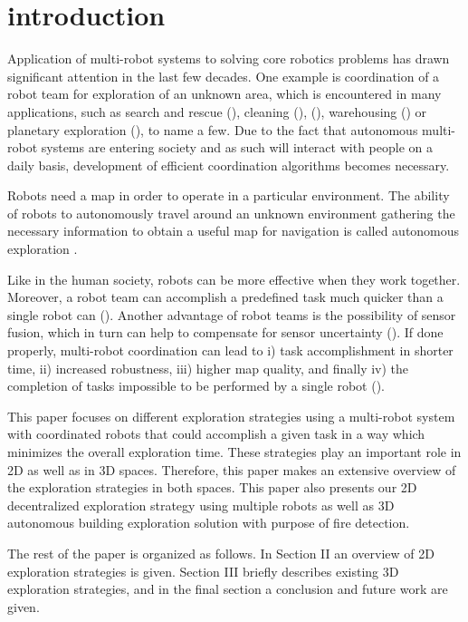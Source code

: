 \section{introduction}

Application of multi-robot systems to solving core robotics problems has drawn significant attention in the last few decades. One example is coordination of a robot team for exploration of an unknown area, which is encountered in many applications, such as search and rescue (\cite{Murphy2004}), cleaning (\cite{Endres}), (\cite{Pinheiro2015}), warehousing (\cite{Wurman2008}) or planetary exploration (\cite{Mataric2001}), to name a few. Due to the fact that autonomous multi-robot systems are entering society and as such will interact with people on a daily basis, development of efficient coordination algorithms becomes necessary.

Robots need a map in order to operate in a particular environment. The ability of robots to autonomously travel around an unknown environment gathering the necessary information to obtain a useful map for navigation is called autonomous exploration \cite{Julia2012}. 

Like in the human society, robots can be more effective when they work together. Moreover, a robot team can accomplish a predefined task much quicker than a single robot can (\cite{Dias2000}). Another advantage of robot teams is the possibility of sensor fusion, which in turn can help to compensate for sensor uncertainty (\cite{Wurm2008}).
If done properly, multi-robot coordination can lead to i) task accomplishment in shorter time, ii) increased robustness, iii) higher map quality, and finally iv) the completion of tasks impossible to be performed by a single robot (\cite{Dias2006}).

This paper focuses on different exploration strategies using a multi-robot system with coordinated robots that could accomplish a given task in a way which minimizes the overall exploration time. These strategies play an important role in 2D as well as in 3D spaces. Therefore, this paper makes an extensive overview of the exploration strategies in both spaces. This paper also presents our 2D decentralized exploration strategy using multiple robots as well as 3D autonomous building exploration solution with purpose of fire detection.

The rest of the paper is organized as follows. 
In Section II an overview of 2D exploration strategies is given. Section III briefly describes existing 3D exploration strategies, and in the final section a conclusion and future work are given.
